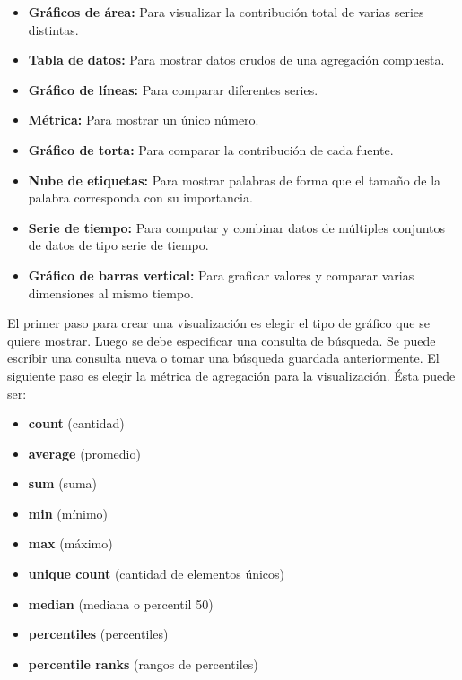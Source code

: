 \begin{itemize}

  \item \textbf{Gráficos de área:}
  Para visualizar la contribución total de varias series distintas.

  \item \textbf{Tabla de datos:}
  Para mostrar datos crudos de una agregación compuesta.

  \item \textbf{Gráfico de líneas:}
  Para comparar diferentes series.

  \item \textbf{Métrica:}
  Para mostrar un único número.

  \item \textbf{Gráfico de torta:}
  Para comparar la contribución de cada fuente.

  \item \textbf{Nube de etiquetas:}
  Para mostrar palabras de forma que el tamaño de la palabra corresponda con su importancia.

  \item \textbf{Serie de tiempo:}
  Para computar y combinar datos de múltiples conjuntos de datos de tipo serie de tiempo.

  \item \textbf{Gráfico de barras vertical:}
  Para graficar valores y comparar varias dimensiones al mismo tiempo.

\end{itemize}


El primer paso para crear una visualización es elegir el tipo de gráfico que se
quiere mostrar. Luego se debe especificar una consulta de búsqueda. Se puede
escribir una consulta nueva o tomar una búsqueda guardada anteriormente. El
siguiente paso es elegir la métrica de agregación para la visualización. Ésta
puede ser:

\begin{itemize}
  \item \textbf{count} (cantidad)
  \item \textbf{average} (promedio)
  \item \textbf{sum} (suma)
  \item \textbf{min} (mínimo)
  \item \textbf{max} (máximo)
  \item \textbf{unique count} (cantidad de elementos únicos)
  \item \textbf{median} (mediana o percentil 50)
  \item \textbf{percentiles} (percentiles)
  \item \textbf{percentile ranks} (rangos de percentiles)
\end{itemize}

